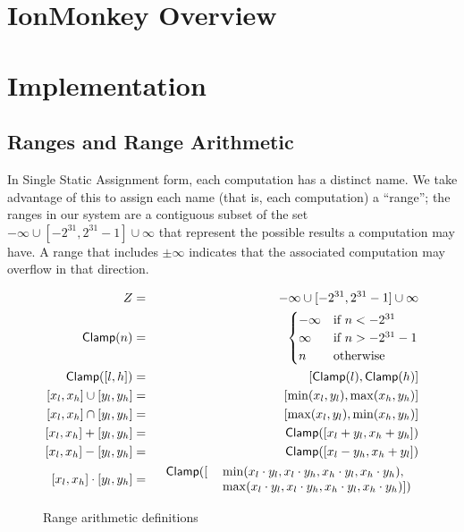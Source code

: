 \documentclass{article}
\newcommand{\Clamp}{\mathsf{Clamp}}
\let\x\cdot
\begin{document}
\section{IonMonkey Overview}

\section{Implementation}

\subsection{Ranges and Range Arithmetic}

In Single Static Assignment form, each computation has a distinct
name. We take advantage of this to assign each name (that is, each
computation) a ``range''; the ranges in our system are a contiguous
subset of the set ${-\infty} \cup [-2^{31}, 2^{31}-1] \cup {\infty}$
that represent the possible results a computation may have. A range
that includes $\pm \infty$ indicates that the associated
computation may overflow in that direction.

\begin{figure}[ht]
\begin{eqnarray*}
Z &=& {-\infty} \cup [-2^{31}, 2^{31}-1] \cup {\infty} \\
\Clamp(n) &=& \begin{cases}
-\infty &\text{if } n < -2^{31} \\
\infty &\text{if } n > -2^{31}-1 \\
n&\text{otherwise } \\
\end{cases}\\
\Clamp([l, h]) &=& [\Clamp(l), \Clamp(h)] \\
{[x_l, x_h] \cup [y_l, y_h]} &=& [\min(x_l, y_l), \max(x_h, y_h)] \\
{[x_l, x_h] \cap [y_l, y_h]} &=& [\max(x_l, y_l), \min(x_h, y_h)] \\
{[x_l, x_h] + [y_l, y_h]} &=& \Clamp ([x_l + y_l, x_h + y_h]) \\
{[x_l, x_h] - [y_l, y_h]} &=& \Clamp ([x_l - y_h, x_h + y_l]) \\
{[x_l, x_h] \x [y_l, y_h]} &=& 
\begin{tabular}{rl}
$\Clamp ([$&$\min(x_l \x y_l, x_l \x y_h, x_h \x y_l, x_h \x y_h),$\\
&$\max(x_l \x y_l, x_l \x y_h, x_h \x y_l, x_h \x y_h)])$ \\
\end{tabular}
\end{eqnarray*}

\caption{Range arithmetic definitions}
\label{fig:range_arith}
\end{figure}
\end{document}
